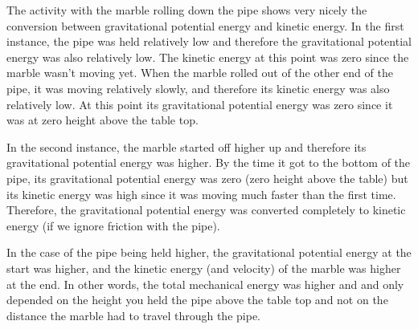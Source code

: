 The activity with the marble rolling down the pipe shows very nicely the conversion between gravitational potential energy and kinetic energy. In the first instance, the pipe was held relatively low and therefore the gravitational potential energy was also relatively low. The kinetic energy at this point was zero since the marble wasn't moving yet. When the marble rolled out of the other end of the pipe, it was moving relatively slowly, and therefore its kinetic energy was also relatively low. At this point its gravitational potential energy was zero since it was at zero height above the table top. 

In the second instance, the marble started off higher up and therefore its gravitational potential energy was higher. By the time it got to the bottom of the pipe, its gravitational potential energy was zero (zero height above the table) but its kinetic energy was high since it was moving much faster than the first time. Therefore, the gravitational potential energy was converted completely to kinetic energy (if we ignore friction with the pipe). 

In the case of the pipe being held higher, the gravitational potential energy at the start was higher, and the kinetic energy (and velocity) of the marble was higher at the end. In other words, the total mechanical energy was higher and and only depended on the height you held the pipe above the table top and not on the distance the marble had to travel through the pipe. 


